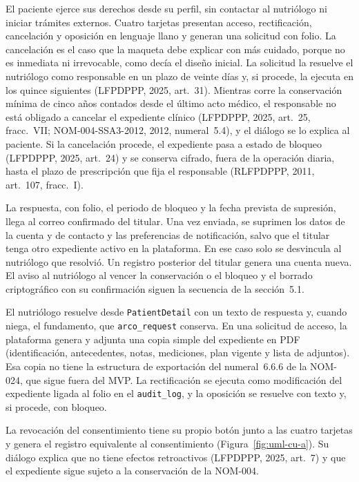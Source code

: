 \documentclass[12pt, a4paper]{article}
\begin{document}
El paciente ejerce sus derechos desde su perfil, sin contactar al
nutriólogo ni iniciar trámites externos. Cuatro tarjetas presentan
acceso, rectificación, cancelación y oposición en lenguaje llano y
generan una solicitud con folio. La cancelación es el caso que la
maqueta debe explicar con más cuidado, porque no es inmediata ni
irrevocable, como decía el diseño inicial. La solicitud la resuelve el nutriólogo como
responsable en un plazo de veinte días y, si procede, la ejecuta en los
quince siguientes (LFPDPPP, 2025, art.~31). Mientras corre la
conservación mínima de cinco años contados desde el último acto médico,
el responsable no está obligado a cancelar el expediente clínico
(LFPDPPP, 2025, art.~25, fracc.~VII; NOM-004-SSA3-2012, 2012,
numeral~5.4), y el diálogo se lo explica al paciente. Si la cancelación
procede, el expediente pasa a estado de bloqueo (LFPDPPP, 2025, art.~24)
y se conserva cifrado, fuera de la operación diaria, hasta el plazo de
prescripción que fija el responsable (RLFPDPPP, 2011, art.~107,
fracc.~I).

La respuesta, con folio, el periodo de bloqueo y la fecha prevista de
supresión, llega al correo confirmado del titular. Una vez enviada, se
suprimen los datos de la cuenta y de contacto y las preferencias de
notificación, salvo que el titular tenga otro expediente activo en la
plataforma. En ese caso solo se desvincula al nutriólogo que resolvió.
Un registro posterior del titular genera una cuenta nueva. El aviso al
nutriólogo al vencer la conservación o el bloqueo y el borrado
criptográfico con su confirmación siguen la secuencia de la
sección~5.1.
 
El nutriólogo resuelve desde \texttt{PatientDetail} con un texto de
respuesta y, cuando niega, el fundamento, que \texttt{arco\_request}
conserva. En una solicitud de acceso, la plataforma genera y adjunta una
copia simple del expediente en PDF (identificación, antecedentes, notas,
mediciones, plan vigente y lista de adjuntos). Esa copia no tiene la
estructura de exportación del numeral~6.6.6 de la NOM-024, que sigue
fuera del MVP. La rectificación se ejecuta como modificación del
expediente ligada al folio en el \texttt{audit\_log}, y la oposición se
resuelve con texto y, si procede, con bloqueo.

La revocación del consentimiento tiene su propio botón junto a las
cuatro tarjetas y genera el registro equivalente al consentimiento
(Figura~\ref{fig:uml-cu-a}). Su diálogo explica que no tiene efectos
retroactivos (LFPDPPP, 2025, art.~7) y que el expediente sigue sujeto a
la conservación de la NOM-004.
 
\end{document}
